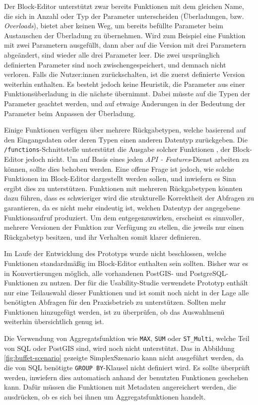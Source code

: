Der Block-Editor unterstützt zwar bereits Funktionen mit dem gleichen Name, die sich in Anzahl oder Typ der Parameter unterscheiden (Überladungen, bzw. \textit{Overloads}), bietet aber keinen Weg, um bereits befüllte Parameter beim Austauschen der Überladung zu übernehmen. Wird zum Beispiel eine Funktion mit zwei Parametern ausgefüllt, dann aber auf die Version mit drei Parametern abgeändert, sind wieder alle drei Parameter leer. Die zwei ursprünglich definierten Parameter sind noch zwischengespeichert, und demnach nicht verloren. Falls die Nutzer:innen zurückschalten, ist die zuerst definierte Version weiterhin enthalten. Es besteht jedoch keine Heuristik, die Parameter aus einer Funktionsüberladung in die nächste übernimmt. Dabei müsste auf die Typen der Parameter geachtet werden, und auf etwaige Änderungen in der Bedeutung der Parameter beim Anpassen der Überladung.

Einige Funktionen verfügen über mehrere Rückgabetypen, welche basierend auf den Eingangsdaten oder deren Typen einen anderen Datentyp zurückgeben. Die \texttt{/functions}-Schnittstelle unterstützt die Ausgabe solcher Funktionen , der Block-Editor jedoch nicht. Um auf Basis eines jeden \textit{API - Features}-Dienst arbeiten zu können, sollte dies behoben werden. Eine offene Frage ist jedoch, wie solche Funktionen im Block-Editor dargestellt werden sollen, und inwiefern es Sinn ergibt dies zu unterstützen. Funktionen mit mehreren Rückgabetypen könnten dazu führen, dass es schwieriger wird die strukturelle Korrektheit der Abfragen zu garantieren, da es nicht mehr eindeutig ist, welchen Datentyp der angegebene Funktionsaufruf produziert. Um dem entgegenzuwirken, erscheint es sinnvoller, mehrere Versionen der Funktion zur Verfügung zu stellen, die jeweils nur einen Rückgabetyp besitzen, und ihr Verhalten somit klarer definieren.

Im Laufe der Entwicklung des Prototyps wurde nicht beschlossen, welche Funktionen standardmäßig im Block-Editor enthalten sein sollten. Bisher war es in Konvertierungen möglich, alle vorhandenen PostGIS- und PostgreSQL-Funktionen zu nutzen. Der für die Usability-Studie verwendete Prototyp enthält nur eine Teilauswahl dieser Funktionen und ist somit noch nicht in der Lage alle benötigten Abfragen für den Praxisbetrieb zu unterstützen. Sollten mehr Funktionen hinzugefügt werden, ist zu überprüfen, ob das Auswahlmenü weiterhin übersichtlich genug ist.

Die Verwendung von Aggregatsfunktion wie \texttt{MAX}, \texttt{SUM} oder \texttt{ST\_Multi}, welche Teil von \ac{SQL} oder PostGIS sind, wird noch nicht unterstützt. Das in Abbildung \ref{fig:buffet-scenario} gezeigte SimplexSzenario kann nicht ausgeführt werden, da die von \ac{SQL} benötigte \texttt{GROUP BY}-Klausel nicht definiert wird. Es sollte überprüft werden, inwiefern dies automatisch anhand der benutzten Funktionen geschehen kann. Dafür müssen die Funktionen mit Metadaten angereichert werden, die ausdrücken, ob es sich bei ihnen um Aggregatsfunktionen handelt.
